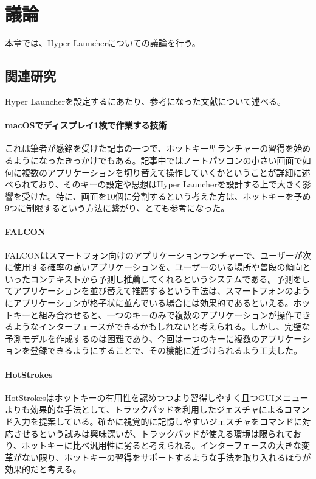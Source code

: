 \chapter{議論}
本章では、Hyper Launcherについての議論を行う。

\newpage

\section{関連研究}
Hyper Launcherを設定するにあたり、参考になった文献について述べる。

\subsubsection{macOSでディスプレイ1枚で作業する技術}
これは筆者が感銘を受けた記事\cite{onedisplay}の一つで、ホットキー型ランチャーの習得を始めるようになったきっかけでもある。記事中ではノートパソコンの小さい画面で如何に複数のアプリケーションを切り替えて操作していくかということが詳細に述べられており、そのキーの設定や思想はHyper Launcherを設計する上で大きく影響を受けた。特に、画面を10個に分割するという考えた方は、ホットキーを予め9つに制限するという方法に繋がり、とても参考になった。

\subsubsection{FALCON}
FALCON\cite{falcon}はスマートフォン向けのアプリケーションランチャーで、ユーザーが次に使用する確率の高いアプリケーションを、ユーザーのいる場所や普段の傾向といったコンテキストから予測し推薦してくれるというシステムである。予測をしてアプリケーションを並び替えて推薦するという手法は、スマートフォンのようにアプリケーションが格子状に並んでいる場合には効果的であるといえる。ホットキーと組み合わせると、一つのキーのみで複数のアプリケーションが操作できるようなインターフェースができるかもしれないと考えられる。しかし、完璧な予測モデルを作成するのは困難であり、今回は一つのキーに複数のアプリケーションを登録できるようにすることで、その機能に近づけられるよう工夫した。

\subsubsection{HotStrokes}
HotStrokes\cite{hotstrokes}はホットキーの有用性を認めつつより習得しやすく且つGUIメニューよりも効果的な手法として、トラックパッドを利用したジェスチャによるコマンド入力を提案している。確かに視覚的に記憶しやすいジェスチャをコマンドに対応させるという試みは興味深いが、トラックパッドが使える環境は限られており、ホットキーに比べ汎用性に劣ると考えられる。インターフェースの大きな変革がない限り、ホットキーの習得をサポートするような手法を取り入れるほうが効果的だと考える。

